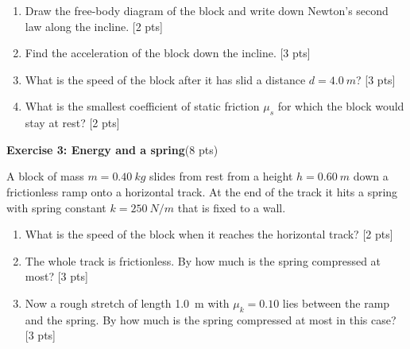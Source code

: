 \documentclass[11pt,a4paper]{article}
\newcommand{\exercise}[3]{\bigskip\par\noindent\textbf{Exercise #1: #2}\hfill(#3 pts)\par\nopagebreak\smallskip}
\newcommand{\pts}[1]{\hfill[#1 pts]}
\begin{document}
\begin{enumerate}
  \item Draw the free-body diagram of the block and write down Newton's second law along the incline.
        \pts{2}
  \item Find the acceleration of the block down the incline. \pts{3}
  \item What is the speed of the block after it has slid a distance $d = \qty{4.0}{m}$? \pts{3}
  \item What is the smallest coefficient of static friction $\mu_s$ for which the block would stay at rest?
        \pts{2}
\end{enumerate}

\exercise{3}{Energy and a spring}{8}
A block of mass $m = \qty{0.40}{kg}$ slides from rest from a height $h = \qty{0.60}{m}$ down a
frictionless ramp onto a horizontal track. At the end of the track it hits a spring with spring constant
$k = \qty{250}{N/m}$ that is fixed to a wall.

\begin{center}
\end{center}

\begin{enumerate}
  \item What is the speed of the block when it reaches the horizontal track? \pts{2}
  \item The whole track is frictionless. By how much is the spring compressed at most? \pts{3}
  \item Now a rough stretch of length \qty{1.0}{m} with $\mu_k = 0.10$ lies between the ramp and the
        spring. By how much is the spring compressed at most in this case? \pts{3}
\end{enumerate}
\end{document}
